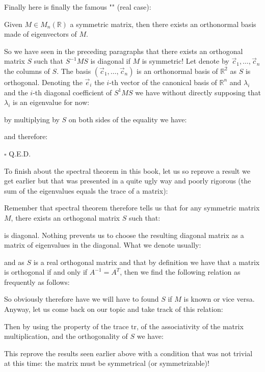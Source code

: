 	Finally here is finally the famous "" (real case):
	\begin{theorem}
	Given $M\in M_n(\mathbb{R})$ a symmetric matrix, then there exists an orthonormal basis made of eigenvectors of $M$.
	\end{theorem}
	\begin{dem}
	So we have seen in the preceding paragraphs that there exists an orthogonal matrix $S$ such that $S^{-1}MS$ is diagonal if $M$ is symmetric! Let denote by $\vec{c}_1,\ldots,\vec{c}_n$ the columns of $S$. The basis $(\vec{c}_1,\ldots,\vec{c}_n)$ is an orthonormal basis of $\mathbb{R}^2$ as $S$ is orthogonal. Denoting the $\vec{e}_i$ the $i$-th vector of the canonical basis of $\mathbb{R}^n$ and $\lambda_i$ and the $i$-th diagonal coefficient of $S^1{M}S$ we have without directly supposing that $\lambda_i$ is an eigenvalue for now:
	
	by multiplying by $S$ on both sides of the equality we have:
	
	and therefore:
	
	\begin{flushright}
		$\square$  Q.E.D.
	\end{flushright}
	\end{dem}
	To finish about the spectral theorem in this book, let us so reprove a result we get earlier but that was presented in a quite ugly way and poorly  rigorous (the sum of the eigenvalues equals the trace of a matrix):
	
	Remember that spectral theorem therefore tells us that for any symmetric matrix $M$, there exists an orthogonal matrix $S$ such that:
	
	is diagonal. Nothing prevents us to choose the resulting diagonal matrix as a matrix of eigenvalues in the diagonal. What we denote usually:
	
	and as $S$ is a real orthogonal matrix and that by definition we have that a matrix is orthogonal if and only if $A^{-1}=A^T$, then we find the following relation as frequently as follows:
	
	So obviously therefore have we will have to found $S$ if $M$ is known or vice versa. Anyway, let us come back on our topic and take track of this relation:
	
	Then by using the property of the trace $\text{tr}$, of the associativity of the matrix multiplication, and the orthogonality of $S$ we have:
	
	This reprove the results seen earlier above with a condition that was not trivial at this time: the matrix must be symmetrical (or symmetrizable)!
	
